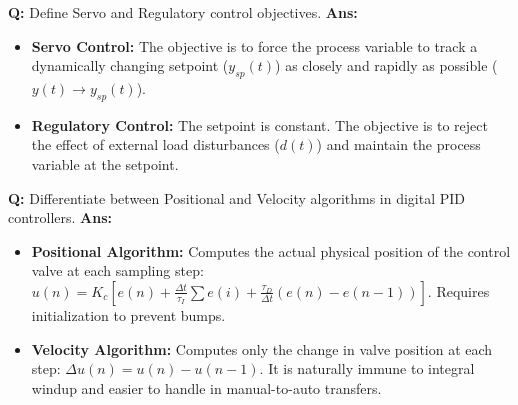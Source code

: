 \documentclass[10pt,a4paper,twocolumn]{article}
\begin{document}
\begin{tcolorbox}[
  colback=white,
  colframe=UnitColorTwo,
  colbacktitle=gray!10!white,
  coltitle=black,
  fonttitle=\bfseries\sffamily\small,
  title={Unit II $\bullet$ Card 12: Servo vs. Regulatory Control},
  boxrule=1.2pt,
  arc=2mm,
  outer arc=2mm,
  boxsep=1.5mm,
  top=1mm,
  bottom=1mm,
  left=1.5mm,
  right=1.5mm,
  before skip=2.5mm,
  after skip=2.5mm
]
\textbf{Q:} Define Servo and Regulatory control objectives.
\tcbline
\textbf{Ans:} \begin{itemize}
  \item   \textbf{Servo Control:} The objective is to force the process variable to track a dynamically changing setpoint ($y_{sp}(t)$) as closely and rapidly as possible ($y(t) \rightarrow y_{sp}(t)$).
  \item   \textbf{Regulatory Control:} The setpoint is constant. The objective is to reject the effect of external load disturbances ($d(t)$) and maintain the process variable at the setpoint.
\end{itemize}
\end{tcolorbox}


\begin{tcolorbox}[
  colback=white,
  colframe=UnitColorTwo,
  colbacktitle=gray!10!white,
  coltitle=black,
  fonttitle=\bfseries\sffamily\small,
  title={Unit II $\bullet$ Card 13: Digital PID Algorithms},
  boxrule=1.2pt,
  arc=2mm,
  outer arc=2mm,
  boxsep=1.5mm,
  top=1mm,
  bottom=1mm,
  left=1.5mm,
  right=1.5mm,
  before skip=2.5mm,
  after skip=2.5mm
]
\textbf{Q:} Differentiate between Positional and Velocity algorithms in digital PID controllers.
\tcbline
\textbf{Ans:} \begin{itemize}
  \item   \textbf{Positional Algorithm:} Computes the actual physical position of the control valve at each sampling step: $u(n) = K_c \left[ e(n) + \frac{\Delta t}{\tau_I} \sum e(i) + \frac{\tau_D}{\Delta t} (e(n) - e(n-1)) \right]$. Requires initialization to prevent bumps.
  \item   \textbf{Velocity Algorithm:} Computes only the change in valve position at each step: $\Delta u(n) = u(n) - u(n-1)$. It is naturally immune to integral windup and easier to handle in manual-to-auto transfers.
\end{itemize}
\end{tcolorbox}
\end{document}
